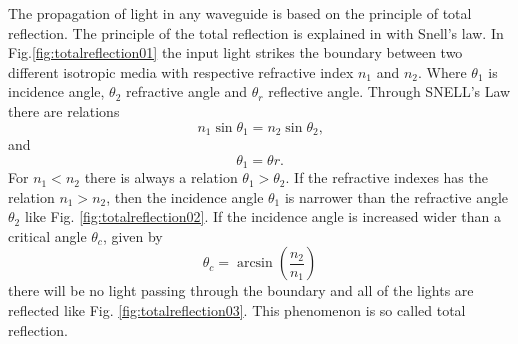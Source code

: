 The propagation of light in any waveguide is based on the principle of total reflection. The principle of the total reflection is explained in \cite{optical_waveguides_fibers} with Snell's law. In Fig.\ref{fig:totalreflection01} the input light strikes the boundary between two different isotropic media with respective refractive index $n_{1}$ and $n_{2}$. Where $\theta_{1}$ is incidence angle, $\theta_{2}$ refractive angle and $\theta_{r}$ reflective angle. Through SNELL's Law there are relations  
\begin{equation*}
n_{1}\sin\theta_{1}=n_{2}\sin\theta_{2} \text{,}
\end{equation*}
and
\begin{equation*}
\theta_{1}=\theta{r} \text{.}
\end{equation*}
For $n_{1}<n_{2}$ there is  always a relation $\theta_{1}>\theta_{2}$.  If the refractive indexes has the relation $n_{1}>n_{2}$, then the incidence angle $\theta_{1}$ is narrower than the refractive angle $\theta_{2}$ like Fig. \ref{fig:totalreflection02}. If the incidence angle is increased wider than a critical angle $\theta_{c}$, given by 
\begin{equation}
\theta_{c}=\arcsin(\frac{n_{2}}{n_{1}})
\label{eq:critical_angle}
\end{equation}
there will be no light passing through the boundary and all of the lights are reflected like Fig. \ref{fig:totalreflection03}. This phenomenon is so called total reflection.\\
